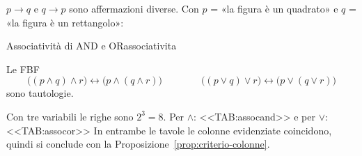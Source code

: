 \begin{spiegazione}
    $p \rightarrow q$ e $q \rightarrow p$ sono affermazioni diverse. Con $p$ = «la figura è un quadrato» e $q$ = «la figura è un rettangolo»:
    \begin{center}
    \end{center}
\end{spiegazione}


\begin{concetto}
\begin{Proposizione}{Associatività di AND e OR}{associativita}
    \begin{prerequisiti}
    \end{prerequisiti}
    Le FBF
    \[ \big((p \wedge q) \wedge r\big) \leftrightarrow \big(p \wedge (q \wedge r)\big) \qquad\qquad
       \big((p \vee q) \vee r\big) \leftrightarrow \big(p \vee (q \vee r)\big) \]
    sono tautologie.
\end{Proposizione}

\begin{dimostrazione}
    Con tre variabili le righe sono $2^3 = 8$. Per $\wedge$:
    <<TAB:assocand>>
    e per $\vee$:
    <<TAB:assocor>>
    In entrambe le tavole le colonne evidenziate coincidono, quindi si conclude con la Proposizione~\ref{prop:criterio-colonne}.
\end{dimostrazione}
\end{concetto}

